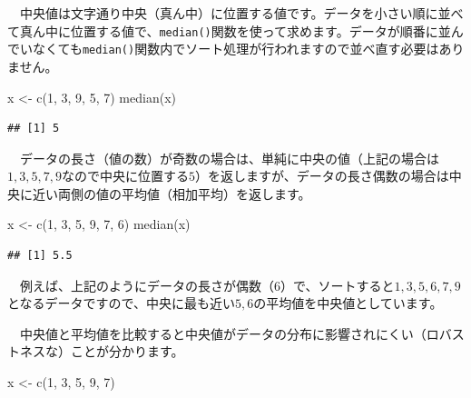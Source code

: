 \documentclass[
  12pt,
]{book}
\newenvironment{Shaded}{\begin{snugshade}}{\end{snugshade}}
\newcommand{\DecValTok}[1]{\textcolor[rgb]{0.00,0.00,0.81}{#1}}
\newcommand{\FunctionTok}[1]{\textcolor[rgb]{0.00,0.00,0.00}{#1}}
\newcommand{\NormalTok}[1]{#1}
\newcommand{\OtherTok}[1]{\textcolor[rgb]{0.56,0.35,0.01}{#1}}
\begin{document}
　中央値は文字通り中央（真ん中）に位置する値です。データを小さい順に並べて真ん中に位置する値で、\texttt{median()}関数を使って求めます。データが順番に並んでいなくても\texttt{median()}関数内でソート処理が行われますので並べ直す必要はありません。

\begin{Shaded}
\begin{Highlighting}[numbers=left,,]
\NormalTok{x }\OtherTok{\textless{}{-}} \FunctionTok{c}\NormalTok{(}\DecValTok{1}\NormalTok{, }\DecValTok{3}\NormalTok{, }\DecValTok{9}\NormalTok{, }\DecValTok{5}\NormalTok{, }\DecValTok{7}\NormalTok{)}
\FunctionTok{median}\NormalTok{(x)}
\end{Highlighting}
\end{Shaded}

\begin{verbatim}
## [1] 5
\end{verbatim}

　データの長さ（値の数）が奇数の場合は、単純に中央の値（上記の場合は\(1, 3, 5, 7, 9\)なので中央に位置する\(5\)）を返しますが、データの長さ偶数の場合は中央に近い両側の値の平均値（相加平均）を返します。

\begin{Shaded}
\begin{Highlighting}[numbers=left,,]
\NormalTok{x }\OtherTok{\textless{}{-}} \FunctionTok{c}\NormalTok{(}\DecValTok{1}\NormalTok{, }\DecValTok{3}\NormalTok{, }\DecValTok{5}\NormalTok{, }\DecValTok{9}\NormalTok{, }\DecValTok{7}\NormalTok{, }\DecValTok{6}\NormalTok{)}
\FunctionTok{median}\NormalTok{(x)}
\end{Highlighting}
\end{Shaded}

\begin{verbatim}
## [1] 5.5
\end{verbatim}

　例えば、上記のようにデータの長さが偶数（\(6\)）で、ソートすると\(1, 3, 5, 6, 7, 9\)となるデータですので、中央に最も近い\(5, 6\)の平均値を中央値としています。

　中央値と平均値を比較すると中央値がデータの分布に影響されにくい（ロバストネスな）ことが分かります。

\begin{Shaded}
\begin{Highlighting}[numbers=left,,]
\NormalTok{x }\OtherTok{\textless{}{-}} \FunctionTok{c}\NormalTok{(}\DecValTok{1}\NormalTok{, }\DecValTok{3}\NormalTok{, }\DecValTok{5}\NormalTok{, }\DecValTok{9}\NormalTok{, }\DecValTok{7}\NormalTok{)}
\end{Highlighting}
\end{Shaded}
\end{document}
